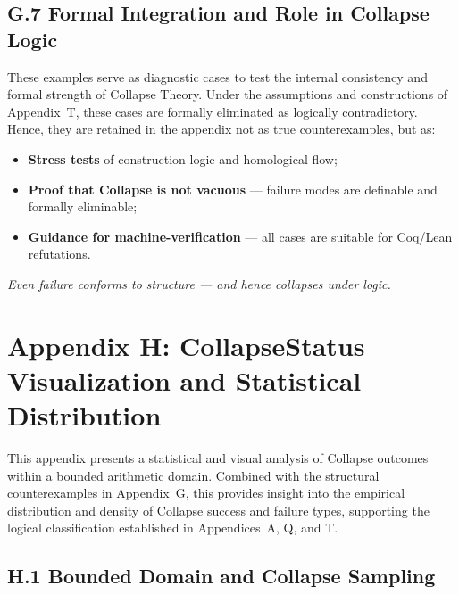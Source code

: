 \documentclass[11pt]{article}
\begin{document}
\subsection*{G.7 Formal Integration and Role in Collapse Logic}

These examples serve as diagnostic cases to test the internal consistency and formal strength of Collapse Theory.  
Under the assumptions and constructions of Appendix~T, these cases are formally eliminated as logically contradictory.  
Hence, they are retained in the appendix not as true counterexamples, but as:

\begin{itemize}
  \item \textbf{Stress tests} of construction logic and homological flow;
  \item \textbf{Proof that Collapse is not vacuous} — failure modes are definable and formally eliminable;
  \item \textbf{Guidance for machine-verification} — all cases are suitable for Coq/Lean refutations.
\end{itemize}

\begin{center}
\textit{Even failure conforms to structure — and hence collapses under logic.}
\end{center}



\section*{Appendix H: CollapseStatus Visualization and Statistical Distribution}

This appendix presents a statistical and visual analysis of Collapse outcomes  
within a bounded arithmetic domain. Combined with the structural counterexamples in Appendix~G,  
this provides insight into the empirical distribution and density of Collapse success and failure  
types, supporting the logical classification established in Appendices~A, Q, and T.

\subsection*{H.1 Bounded Domain and Collapse Sampling}
\end{document}
